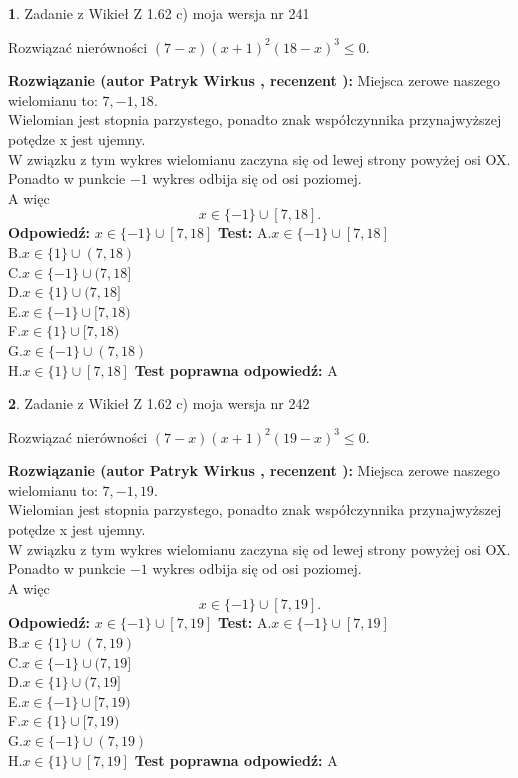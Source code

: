 \documentclass[12pt, a4paper]{article}
\theoremstyle{definition} %
\newtheorem{zad}{}
\newcommand{\zadStart}[1]{\begin{zad}#1\newline}
\newcommand{\zadStop}{\end{zad}}
\newcommand{\rozwStart}[2]{\noindent \textbf{Rozwiązanie (autor #1 , recenzent #2): }\newline}
\newcommand{\rozwStop}{\newline}
\newcommand{\odpStart}{\noindent \textbf{Odpowiedź:}\newline}
\newcommand{\odpStop}{\newline}
\newcommand{\testStart}{\noindent \textbf{Test:}\newline}
\newcommand{\testStop}{\newline}
\newcommand{\kluczStart}{\noindent \textbf{Test poprawna odpowiedź:}\newline}
\newcommand{\kluczStop}{\newline}
\begin{document}
\zadStart{Zadanie z Wikieł Z 1.62 c) moja wersja nr 241}

Rozwiązać nierówności $(7-x)(x+1)^{2}(18-x)^{3}\le0$.
\zadStop
\rozwStart{Patryk Wirkus}{}
Miejsca zerowe naszego wielomianu to: $7, -1, 18$.\\
Wielomian jest stopnia parzystego, ponadto znak współczynnika przy\linebreak najwyższej potędze x jest ujemny.\\ W związku z tym wykres wielomianu zaczyna się od lewej strony powyżej osi OX.\\
Ponadto w punkcie $-1$ wykres odbija się od osi poziomej.\\
A więc $$x \in \{-1\} \cup [7,18].$$
\rozwStop
\odpStart
$x \in \{-1\} \cup [7,18]$
\odpStop
\testStart
A.$x \in \{-1\} \cup [7,18]$\\
B.$x \in \{1\} \cup (7,18)$\\
C.$x \in \{-1\} \cup (7,18]$\\
D.$x \in \{1\} \cup (7,18]$\\
E.$x \in \{-1\} \cup [7,18)$\\
F.$x \in \{1\} \cup [7,18)$\\
G.$x \in \{-1\} \cup (7,18)$\\
H.$x \in \{1\} \cup [7,18]$
\testStop
\kluczStart
A
\kluczStop



\zadStart{Zadanie z Wikieł Z 1.62 c) moja wersja nr 242}

Rozwiązać nierówności $(7-x)(x+1)^{2}(19-x)^{3}\le0$.
\zadStop
\rozwStart{Patryk Wirkus}{}
Miejsca zerowe naszego wielomianu to: $7, -1, 19$.\\
Wielomian jest stopnia parzystego, ponadto znak współczynnika przy\linebreak najwyższej potędze x jest ujemny.\\ W związku z tym wykres wielomianu zaczyna się od lewej strony powyżej osi OX.\\
Ponadto w punkcie $-1$ wykres odbija się od osi poziomej.\\
A więc $$x \in \{-1\} \cup [7,19].$$
\rozwStop
\odpStart
$x \in \{-1\} \cup [7,19]$
\odpStop
\testStart
A.$x \in \{-1\} \cup [7,19]$\\
B.$x \in \{1\} \cup (7,19)$\\
C.$x \in \{-1\} \cup (7,19]$\\
D.$x \in \{1\} \cup (7,19]$\\
E.$x \in \{-1\} \cup [7,19)$\\
F.$x \in \{1\} \cup [7,19)$\\
G.$x \in \{-1\} \cup (7,19)$\\
H.$x \in \{1\} \cup [7,19]$
\testStop
\kluczStart
A
\kluczStop
\end{document}
